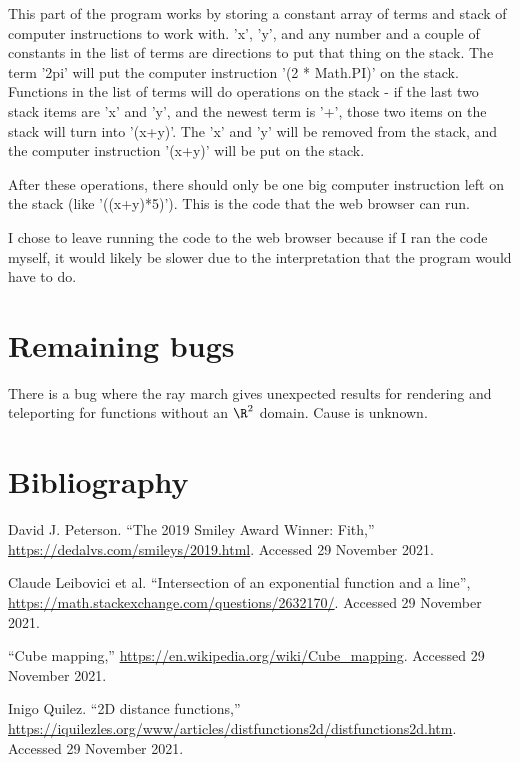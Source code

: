 This part of the program works by storing a constant array of terms and stack of computer instructions to work with.  'x', 'y', and any number and a couple of constants in the list of terms are directions to put that thing on the stack.  The term '2pi' will put the computer instruction '(2 * Math.PI)' on the stack.  Functions in the list of terms will do operations on the stack - if the last two stack items are 'x' and 'y', and the newest term is '+', those two items on the stack will turn into '(x+y)'.  The 'x' and 'y' will be removed from the stack, and the computer instruction '(x+y)' will be put on the stack.

After these operations, there should only be one big computer instruction left on the stack (like '((x+y)*5)').  This is the code that the web browser can run.

I chose to leave running the code to the web browser because if I ran the code myself, it would likely be slower due to the interpretation that the program would have to do.

\section*{Remaining bugs}

There is a bug where the ray march gives unexpected results for rendering and teleporting for functions without an $\R^2$ domain.  Cause is unknown.

\section*{Bibliography}

David J. Peterson.  ``The 2019 Smiley Award Winner: Fith,'' \url{https://dedalvs.com/smileys/2019.html}.  Accessed 29 November 2021.

Claude Leibovici et al.  ``Intersection of an exponential function and a line'', \url{https://math.stackexchange.com/questions/2632170/}.  Accessed 29 November 2021.

``Cube mapping,'' \url{https://en.wikipedia.org/wiki/Cube_mapping}.  Accessed 29 November 2021.

Inigo Quilez.  ``2D distance functions,'' \url{https://iquilezles.org/www/articles/distfunctions2d/distfunctions2d.htm}.  Accessed 29 November 2021.


